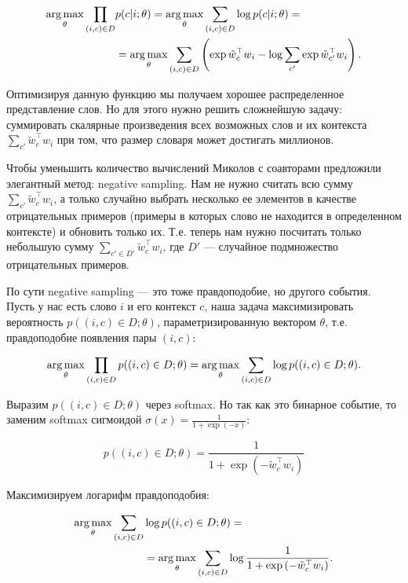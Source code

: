 \begin{equation}
\begin{aligned}
 \operatorname*{arg\,max}_{\theta} \prod_{(i,c)\in D} & p(c|i;\theta) = \operatorname*{arg\,max}_{\theta} \sum_{(i,c)\in D}\log{p(c|i;\theta)} =
\\
 & = \operatorname*{arg\,max}_{\theta} \sum_{(i,c)\in D} \left(\exp{\tilde{w}_c^\top w_i} - \log{\sum_{c'}
\exp{\tilde{w}_{c'}^\top w_i}}\right).
\end{aligned}
\end{equation}

Оптимизируя данную функцию мы получаем хорошее распределенное представление слов. Но для этого нужно решить
сложнейшую задачу: суммировать скалярные произведения всех возможных слов и их контекста $\sum_{c'}
\tilde{w}_c^\top w_i$ при том, что размер словаря может достигать миллионов.

\bigskip
Чтобы уменьшить количество вычислений Миколов с соавторами \cite{Mikolov:2} предложили элегантный метод:
negative sampling. Нам не нужно считать всю сумму $\sum_{c'} \tilde{w}_c^\top w_i$, а только случайно выбрать
несколько ее элементов в качестве отрицательных примеров (примеры в которых слово не находится в определенном
контексте) и обновить только их. Т.е. теперь нам нужно посчитать только небольшую сумму $\sum_{c' \in D'}
\tilde{w}_c^\top w_i$, где $D'$ --- случайное подмножество отрицательных примеров.

\bigskip
По сути negative sampling --- это тоже правдоподобие, но другого события. Пусть у нас есть слово $i$ и его
контекст $c$, наша задача максимизировать вероятность $p((i,c) \in D; \theta)$, параметризированную вектором
$\theta$, т.е. правдоподобие появления пары $(i,c)$:

\begin{equation}
 \operatorname*{arg\,max}_{\theta} \prod_{(i,c)\in D} p((i,c)\in D;\theta) = \operatorname*{arg\,max}_{\theta} \sum_{(i,c)\in D} \log{
p((i,c)\in D;\theta)}.
\end{equation}

Выразим $p((i,c)\in D;\theta)$ через softmax. Но так как это бинарное событие, то заменим softmax сигмоидой
$\sigma (x) = \frac{1}{1+\exp{(-x)}}$:

\begin{equation}
 p((i,c)\in D;\theta) = \frac{1}{1+\exp{(-\tilde{w}_c^{\top} w_i)}}
\end{equation}

Максимизируем логарифм правдоподобия:

\begin{equation} \label{eq:negLikelyhood}
\begin{aligned}
 \operatorname*{arg\,max}_{\theta} \sum_{(i,c)\in D} & \log{p((i,c)\in D;\theta)} = \\
 & = \operatorname*{arg\,max}_{\theta} \sum_{(i,c)\in D} \log{\frac{1}{1+\exp{(-\tilde{w}_c^{\top} w_i)}}}.
\end{aligned}
\end{equation}

